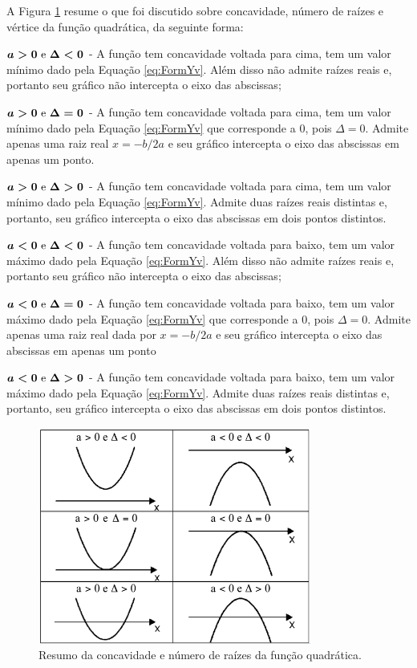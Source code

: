 \documentclass[../main.tex]{subfiles}
\begin{document}
A Figura \ref{fig:ResumoFuncQuad} resume o que foi discutido sobre concavidade, número de raízes e vértice da função quadrática, da seguinte forma:
\begin{compactenum}[(i)]
\item $\boldsymbol{a>0$ e $\Delta <0}$ - A função tem concavidade voltada para cima, tem um valor mínimo dado pela Equação \ref{eq:FormYv}. Além disso não admite raízes reais e, portanto seu gráfico não intercepta o eixo das abscissas;
\item $\boldsymbol{a>0$ e $\Delta =0}$ - A função tem concavidade voltada para cima, tem um valor mínimo dado pela Equação \ref{eq:FormYv} que corresponde a $0$, pois $\Delta=0$. Admite apenas uma raiz real  $x=-b/2a$  e seu gráfico  intercepta o eixo das abscissas em apenas um ponto.
\item $\boldsymbol{a>0$ e $\Delta >0}$ - A função tem concavidade voltada para cima, tem um valor mínimo dado pela Equação \ref{eq:FormYv}. Admite duas raízes reais distintas e, portanto, seu gráfico  intercepta o eixo das abscissas em dois pontos distintos.
\item $\boldsymbol{a<0$ e $\Delta <0}$ - A função tem concavidade voltada para baixo, tem um valor máximo dado pela Equação \ref{eq:FormYv}. Além disso não admite raízes reais e, portanto seu gráfico não intercepta o eixo das abscissas;
\item $\boldsymbol{a<0$ e $\Delta =0}$ - A função tem concavidade voltada para baixo, tem um valor máximo dado pela Equação \ref{eq:FormYv} que corresponde a $0$, pois $\Delta=0$. Admite apenas uma raiz real dada por $x=-b/2a$  e seu gráfico  intercepta o eixo das abscissas em apenas um ponto
\item $\boldsymbol{a<0$ e $\Delta >0}$ - A função tem concavidade voltada para baixo, tem um valor máximo dado pela Equação \ref{eq:FormYv}. Admite duas raízes reais distintas e, portanto, seu gráfico  intercepta o eixo das abscissas em dois pontos distintos.
\end{compactenum}
\begin{figure}[H]
  \centering
  \includegraphics[width=0.8\textwidth]{fig_func/ParabValorDeltaA}
  \caption{Resumo da concavidade e número de raízes da função quadrática.}
  \label{fig:ResumoFuncQuad}
\end{figure}
\end{document}

